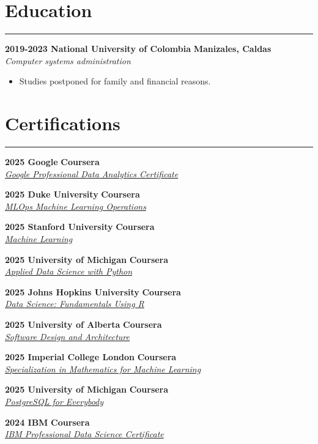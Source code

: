 \documentclass[9pt,a4paper]{article}
\newcommand{\cvevent}[4]{%
  {\noindent \textbf{#1 #2} \hfill \textbf{#3}\\%
   \textit{#4}\\[0pt]}%
}
\begin{document}
\section*{Education}
\vspace{-\baselineskip}
\noindent\rule{\linewidth}{0.5pt}

\cvevent{2019-2023}{National University of Colombia}{Manizales, Caldas}{Computer systems administration}
\vspace{-\baselineskip}
\begin{itemize}[noitemsep, topsep=0pt]
    \item Studies postponed for family and financial reasons.
\end{itemize}

\section*{Certifications}
\vspace{-\baselineskip}
\noindent\rule{\linewidth}{0.5pt}

\cvevent{2025}{Google}{Coursera}{\href{https://www.credly.com/badges/017b44b1-847d-4519-a2d6-8b8ab2af6bb4}{Google Professional Data Analytics Certificate}}
\cvevent{2025}{Duke University}{Coursera}{\href{https://www.coursera.org/account/accomplishments/specialization/9GW0O26FOENS}{MLOps \textbar{} Machine Learning Operations}}
\cvevent{2025}{Stanford University}{Coursera}{\href{https://www.coursera.org/account/accomplishments/specialization/AC7NFFS0WXWP}{Machine Learning}}
\cvevent{2025}{University of Michigan}{Coursera}{\href{https://www.coursera.org/account/accomplishments/specialization/YVQ1D5MLFDQU}{Applied Data Science with Python}}
\cvevent{2025}{Johns Hopkins University}{Coursera}{\href{https://www.coursera.org/account/accomplishments/specialization/MI5FUPDVP8JW}{Data Science: Fundamentals Using R}}
\cvevent{2025}{University of Alberta}{Coursera}{\href{https://www.coursera.org/account/accomplishments/specialization/PMJQNHZRUFV0}{Software Design and Architecture}}
\cvevent{2025}{Imperial College London}{Coursera}{\href{https://www.coursera.org/account/accomplishments/specialization/D7GUABT9DHUU}{Specialization in Mathematics for Machine Learning}}
\cvevent{2025}{University of Michigan}{Coursera}{\href{https://www.coursera.org/account/accomplishments/specialization/8KBK5UWK2HFK}{PostgreSQL for Everybody}}
\cvevent{2024}{IBM}{Coursera}{\href{https://www.credly.com/badges/eeb6412f-cdff-4324-8399-8e6ca143ef9b}{IBM Professional Data Science Certificate}}
\end{document}
